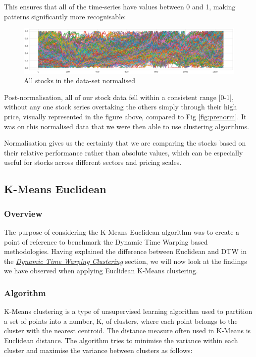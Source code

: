 \documentclass[11pt]{article}
\begin{document}
This ensures that all of the time-series have values between 0 and 1, making patterns significantly more recognisable:

\begin{figure}[H]
\centering
\includegraphics[width=12cm]{img/all-stocks-normal.png} 
\caption{All stocks in the data-set normalised}
\label{fig:normal}
\end{figure}

Post-normalisation, all of our stock data fell within a consistent range [0-1], without any one stock series overtaking the others simply through their high price, visually represented in the figure above, compared to Fig \ref{fig:prenorm}. It was on this normalised data that we were then able to use clustering algorithms. 

Normalisation gives us the certainty that we are comparing the stocks based on their relative performance rather than absolute values, which can be especially useful for stocks across different sectors and pricing scales.

\subsection{K-Means Euclidean}

\subsubsection{Overview}

The purpose of considering the K-Means Euclidean algorithm was to create a point of reference to benchmark the Dynamic Time Warping based methodologies. Having explained the difference between Euclidean and DTW in the \textit{\hyperref[sec:dtw]{Dynamic Time Warping Clustering}} section, we will now look at the findings we have observed when applying Euclidean K-Means clustering.

\subsubsection{Algorithm}

K-Means clustering is a type of unsupervised learning algorithm used to partition a set of points into a number, K, of clusters, where each point belongs to the cluster with the nearest centroid. The distance measure often used in K-Means is Euclidean distance. The algorithm tries to minimise the variance within each cluster and maximise the variance between clusters as follows:
\end{document}
